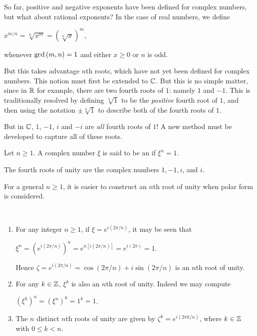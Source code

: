 \documentclass[11pt,fleqn,dvipsnames,usenames]{article}
\newcommand{\p}{\noindent}
\begin{document}
\p So far, positive and negative exponents have been defined for complex numbers, but what about rational exponents?  In the case of real numbers, we define
\begin{center}
$x^{m/n} = \sqrt[n]{x^{m}} = \left(\sqrt[n]{x}\right)^{m}$,
\end{center}
whenever $\text{gcd}\left(m,n\right) = 1$ and either $x\geq 0$ or $n$ is odd.
\vsp

\p But this takes advantage $n$th roots, which have not yet been defined for complex numbers.  This notion must first be extended to $\mathbb{C}$.  But this is no simple matter, since in $\mathbb{R}$ for example, there are two fourth roots of $1$: namely $1$ and $-1$.  This is traditionally resolved by defining $\sqrt[4]{1}$ to be the \emph{positive} fourth root of $1$, and then using the notation $\pm \sqrt[4]{1}$ to describe both of the fourth roots of $1$.
\vsp

\p But in $\mathbb{C}$, $1$, $-1$, $i$ and $-i$ are \emph{all} fourth roots of $1$!  A new method must be developed to capture all of these roots.
\vsp

\begin{definition}
Let $n\geq 1$.  A complex number $\xi$ is said to be an  if $\xi^{n} = 1$.
\end{definition}

\example The fourth roots of unity are the complex numbers $1, -1, i$, and $i$.
\vsp

\p For a general $n\geq 1$, it is easier to construct an $n$th root of unity when polar form is considered.
\vsp

\remarks ~\label{rootsofunity}
\begin{enumerate}[(1)]
\item For any integer $n\geq 1$, if $\xi = e^{i(2\pi/n)}$, it may be seen that
\begin{center}
$\xi^{n} = \left(e^{i(2\pi/n)}\right)^{n} = e^{n[i(2\pi/n)]} = e^{i(2\pi)} = 1$.
\end{center}
\p Hence $\zeta = e^{i(2\pi/n)} = \cos(2\pi/n) + i\sin(2\pi/n)$ is an $n$th root of unity.
\item For any $k\in\mathbb{Z}$, $\xi^{k}$ is also an $n$th root of unity.  Indeed we may compute
\begin{center}
$\left(\xi^{k}\right)^{n} = \left(\xi^{n}\right)^{k} = 1^{k} = 1$.
\end{center}
\item The $n$ distinct $n$th roots of unity are given by $\zeta^{k} = e^{i(2\pi k/n)}$, where $k\in\mathbb{Z}$ with $0\leq k < n$.
\end{enumerate}
\end{document}
